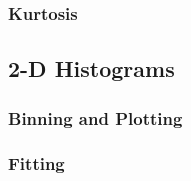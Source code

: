 \subsubsection{Kurtosis}
\label{subsubsec:analysis--redshift_trends--kurtosis}




\subsection{2-D Histograms}
\label{subsec:analysis--2d_histograms}



\subsubsection{Binning and Plotting}
\label{subsubsec:analysis--2d_histograms--binning_plotting}



\subsubsection{Fitting}
\label{subsubsec:analysis--2d_histograms--fitting}




